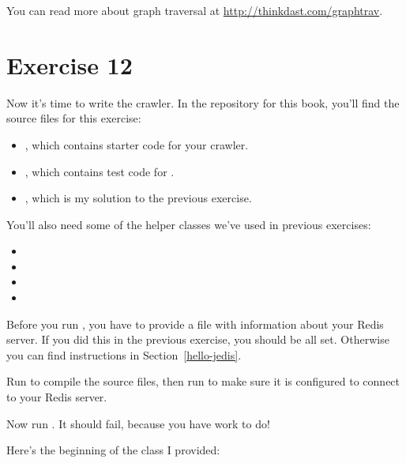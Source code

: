 \documentclass[12pt]{book}
\theoremstyle{exercise}
\begin{document}
You can read more about graph traversal at
\url{http://thinkdast.com/graphtrav}.


\section{Exercise 12}
\label{exercise12}


Now it's time to write the crawler.  In the repository for this book,
you'll find the source files for this exercise:

\begin{itemize}

\item {}, which contains starter code for your
  crawler.

\item {}, which contains test code for
  .

\item {}, which is my solution to the previous
  exercise.

\end{itemize}


You'll also need some of the helper classes we've used in previous
exercises:

\begin{itemize}
\item  {}
\item  {}
\item  {}
\item  {}
\end{itemize}

Before you run , you have to provide a file with
information about your Redis server. If you did this in the previous
exercise, you should be all set. Otherwise you can find instructions in
Section~\ref{hello-jedis}.


Run  to compile the source files, then run
 to make sure it is configured to connect to your
Redis server.

Now run . It should
fail, because you have work to do!

Here's the beginning of the  class I provided:
\end{document}
